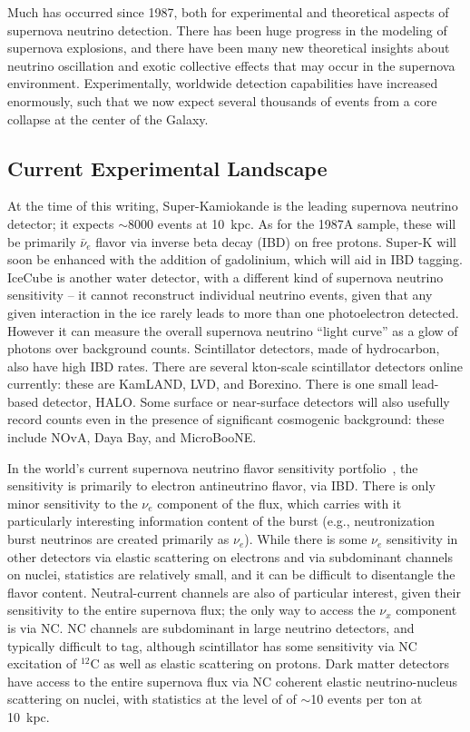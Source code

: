 Much has occurred since 1987, both for experimental and theoretical
aspects of supernova neutrino detection.
There has been huge progress in the modeling of supernova explosions,
and there have been many new theoretical insights about
neutrino oscillation and exotic collective effects that may occur in
the supernova environment.    Experimentally,
worldwide detection capabilities have increased enormously, such that
we now expect several thousands of events from a core collapse at the center
of the Galaxy.

\subsection{Current Experimental Landscape}
At the time of this writing, Super-Kamiokande is the leading supernova
neutrino detector; it expects $\sim$8000 events at 10~kpc.  As for
the 1987A sample, these will be primarily $\bar{\nu}_e$ flavor via
inverse beta decay (IBD) on free protons.  Super-K will soon be
enhanced with the addition of gadolinium, which will aid in IBD
tagging.  IceCube is another water detector, with a different kind of
supernova neutrino sensitivity -- it cannot reconstruct individual
neutrino events, given that any given interaction in the ice rarely
leads to more than one photoelectron detected.  However it can measure
the overall supernova neutrino ``light curve'' as a glow of photons
over background counts.  Scintillator detectors, made of hydrocarbon,
also have high IBD rates.  There are several kton-scale scintillator
detectors online currently: these are KamLAND, LVD, and Borexino.
There is one small lead-based detector, HALO.  Some surface or
near-surface detectors will also usefully record counts even in the
presence of significant cosmogenic background: these include NOvA,
Daya Bay, and MicroBooNE.

In the world's current supernova neutrino flavor sensitivity
portfolio~\cite{Scholberg:2012id, Mirizzi:2015eza}, the sensitivity is primarily to electron antineutrino
flavor, via IBD. There is only minor sensitivity to the $\nu_e$
component of the flux, which carries with it particularly interesting
information content of the burst (e.g., neutronization burst neutrinos
are created primarily as $\nu_e$).  While there is some $\nu_e$
sensitivity in other detectors via elastic scattering on electrons and
via subdominant channels on nuclei, statistics are relatively small,
and it can be difficult to disentangle the flavor content.
Neutral-current channels are also of particular interest, given their
sensitivity to the entire supernova flux; the only way to access the
$\nu_x$ component is via NC.  NC channels are subdominant in large
neutrino detectors, and typically difficult to tag, although
scintillator has some sensitivity via NC excitation of $^{12}$C as
well as elastic scattering on protons.  Dark matter detectors have
access to the entire supernova flux via NC coherent elastic
neutrino-nucleus scattering on nuclei, with statistics at the level of
 of $\sim$10 events per ton at 10~kpc.


